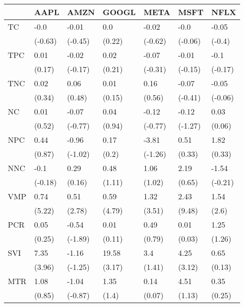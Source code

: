 \begin{tabular}{lllllll}
\toprule
{} &     AAPL &     AMZN &   GOOGL &     META &     MSFT &     NFLX \\
\midrule
TC  &     -0.0 &    -0.01 &     0.0 &    -0.02 &     -0.0 &    -0.05 \\
    &  (-0.63) &  (-0.45) &  (0.22) &  (-0.62) &  (-0.06) &   (-0.4) \\
TPC &     0.01 &    -0.02 &    0.02 &    -0.07 &    -0.01 &     -0.1 \\
    &   (0.17) &  (-0.17) &  (0.21) &  (-0.31) &  (-0.15) &  (-0.17) \\
TNC &     0.02 &     0.06 &    0.01 &     0.16 &    -0.07 &    -0.05 \\
    &   (0.34) &   (0.48) &  (0.15) &   (0.56) &  (-0.41) &  (-0.06) \\
NC  &     0.01 &    -0.07 &    0.04 &    -0.12 &    -0.12 &     0.03 \\
    &   (0.52) &  (-0.77) &  (0.94) &  (-0.77) &  (-1.27) &   (0.06) \\
NPC &     0.44 &    -0.96 &    0.17 &    -3.81 &     0.51 &     1.82 \\
    &   (0.87) &  (-1.02) &   (0.2) &  (-1.26) &   (0.33) &   (0.33) \\
NNC &     -0.1 &     0.29 &    0.48 &     1.06 &     2.19 &    -1.54 \\
    &  (-0.18) &   (0.16) &  (1.11) &   (1.02) &   (0.65) &  (-0.21) \\
VMP &     0.74 &     0.51 &    0.59 &     1.32 &     2.43 &     1.54 \\
    &   (5.22) &   (2.78) &  (4.79) &   (3.51) &   (9.48) &    (2.6) \\
PCR &     0.05 &    -0.54 &    0.01 &     0.49 &     0.01 &     1.25 \\
    &   (0.25) &  (-1.89) &  (0.11) &   (0.79) &   (0.03) &   (1.26) \\
SVI &     7.35 &    -1.16 &   19.58 &      3.4 &     4.25 &     0.65 \\
    &   (3.96) &  (-1.25) &  (3.17) &   (1.41) &   (3.12) &   (0.13) \\
MTR &     1.08 &    -1.04 &    1.35 &     0.14 &     4.51 &     0.35 \\
    &   (0.85) &  (-0.87) &   (1.4) &   (0.07) &   (1.13) &   (0.25) \\
\bottomrule
\end{tabular}
